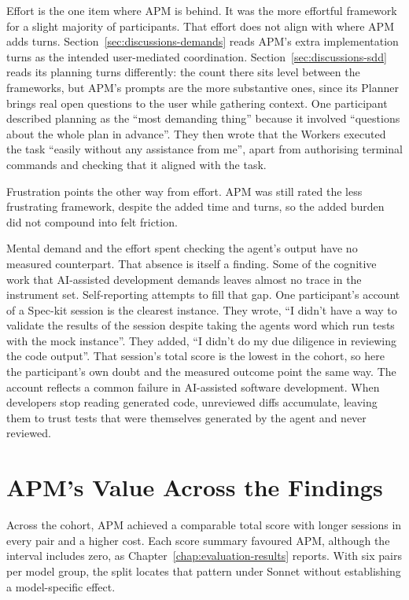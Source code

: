 Effort is the one item where APM is behind. It was the more effortful framework for a slight majority of participants. That effort does not align with where APM adds turns. Section~\ref{sec:discussions-demands} reads APM's extra implementation turns as the intended user-mediated coordination. Section~\ref{sec:discussions-sdd} reads its planning turns differently: the count there sits level between the frameworks, but APM's prompts are the more substantive ones, since its Planner brings real open questions to the user while gathering context. One participant described planning as the ``most demanding thing'' because it involved ``questions about the whole plan in advance''. They then wrote that the Workers executed the task ``easily without any assistance from me'', apart from authorising terminal commands and checking that it aligned with the task.

Frustration points the other way from effort. APM was still rated the less frustrating framework, despite the added time and turns, so the added burden did not compound into felt friction.

Mental demand and the effort spent checking the agent's output have no measured counterpart. That absence is itself a finding. Some of the cognitive work that AI-assisted development demands leaves almost no trace in the instrument set. Self-reporting attempts to fill that gap. One participant's account of a Spec-kit session is the clearest instance. They wrote, ``I didn't have a way to validate the results of the session despite taking the agents word which run tests with the mock instance''. They added, ``I didn't do my due diligence in reviewing the code output''. That session's total score is the lowest in the cohort, so here the participant's own doubt and the measured outcome point the same way. The account reflects a common failure in AI-assisted software development. When developers stop reading generated code, unreviewed diffs accumulate, leaving them to trust tests that were themselves generated by the agent and never reviewed.

\section{APM's Value Across the Findings}
\label{sec:discussions-structure-tradeoff}

Across the cohort, APM achieved a comparable total score with longer sessions in every pair and a higher cost. Each score summary favoured APM, although the interval includes zero, as Chapter~\ref{chap:evaluation-results} reports. With six pairs per model group, the split locates that pattern under Sonnet without establishing a model-specific effect.

